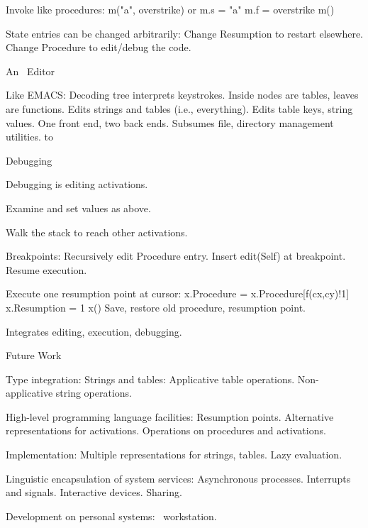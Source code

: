 \Bullet Invoke like procedures:
		{\pt m("a", overstrike)}
	or
		{\pt m.s = "a"
		m.f = overstrike
		m()}

\Bullet State entries can be changed arbitrarily:
		Change {\pt Resumption} to restart elsewhere.
		Change {\pt Procedure} to edit/debug the code.

\NewPage
\centerline{\bigrm An \EZ\ Editor}
\Bullet Like EMACS:
		Decoding tree interprets keystrokes.
		Inside nodes are tables, leaves are functions.
\Bullet Edits strings and tables (i.e., everything).
		Edits table keys, string values.
		One front end, two back ends.
		Subsumes file, directory management utilities.
\medskip
\tabskip=0pt \halign to 

\NewPage
\centerline{\bigrm Debugging}
\Bullet Debugging is editing activations.

\Bullet Examine and set values as above.

\Bullet Walk the stack to reach other activations.

\Bullet Breakpoints:  
		Recursively edit {\pt Procedure} entry.
		Insert {\pt edit(Self)} at breakpoint.
		Resume execution.

\Bullet Execute one resumption point at cursor:
		{\pt x.Procedure = x.Procedure[f(cx,cy)!1]
		x.Resumption = 1
		x()}
	Save, restore old procedure, resumption point.

\Bullet Integrates editing, execution, debugging.

\NewPage
\centerline{\bigrm Future Work}
\Bullet Type integration:
		Strings and tables:
			Applicative table operations.
			Non-applicative string operations.

\Bullet High-level programming language facilities:
		Resumption points.
		Alternative representations for activations.
		Operations on procedures and activations.

\Bullet Implementation:
		Multiple representations for strings, tables.
		Lazy evaluation.

\Bullet Linguistic encapsulation of system services:
		Asynchronous processes.
		Interrupts and signals.
		Interactive devices.
		Sharing.

\Bullet Development on personal systems:
		\EZ\ workstation.
\bye
